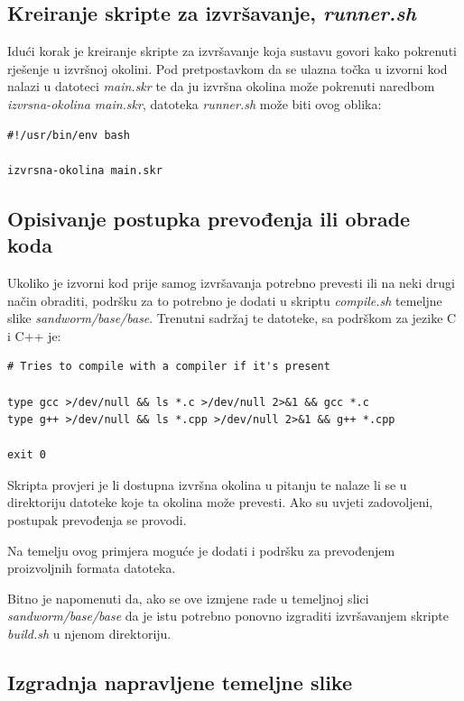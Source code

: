 \documentclass[times, utf8, zavrsni]{fer}
\begin{document}
{{{\begin{appendices}
\subsection{Kreiranje skripte za izvršavanje, {\textit{runner.sh}}}

Idući korak je kreiranje skripte za izvršavanje koja sustavu govori kako pokrenuti rješenje u izvršnoj okolini. Pod pretpostavkom da se ulazna točka u izvorni kod nalazi u datoteci {\textit{main.skr}} te da ju izvršna okolina može pokrenuti naredbom {\textit{izvrsna-okolina main.skr}}, datoteka {\textit{runner.sh}} može biti ovog oblika:

\begin{lstlisting}
#!/usr/bin/env bash

izvrsna-okolina main.skr
\end{lstlisting}

\subsection{Opisivanje postupka prevođenja ili obrade koda}

Ukoliko je izvorni kod prije samog izvršavanja potrebno prevesti ili na neki drugi način obraditi, podršku za to potrebno je dodati u skriptu {\textit{compile.sh}} temeljne slike {\textit{sandworm/base/base}}. Trenutni sadržaj te datoteke, sa podrškom za jezike C i C++ je:

\begin{lstlisting}
# Tries to compile with a compiler if it's present

type gcc >/dev/null && ls *.c >/dev/null 2>&1 && gcc *.c
type g++ >/dev/null && ls *.cpp >/dev/null 2>&1 && g++ *.cpp

exit 0
\end{lstlisting}

Skripta provjeri je li dostupna izvršna okolina u pitanju te nalaze li se u direktoriju datoteke koje ta okolina može prevesti. Ako su uvjeti zadovoljeni, postupak prevođenja se provodi.

Na temelju ovog primjera moguće je dodati i podršku za prevođenjem proizvoljnih formata datoteka.

Bitno je napomenuti da, ako se ove izmjene rade u temeljnoj slici {\textit{sandworm/base/base}} da je istu potrebno ponovno izgraditi izvršavanjem skripte {\textit{build.sh}} u njenom direktoriju.

\subsection{Izgradnja napravljene temeljne slike}


\end{appendices}}}}
\end{document}
